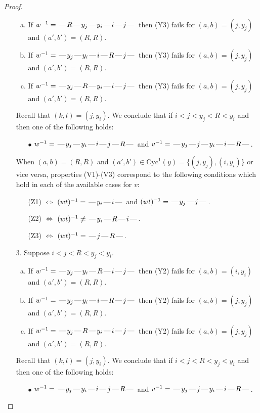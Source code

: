 \documentclass[10pt]{article}
\theoremstyle{definition}
\theoremstyle{definition}
\def\dash{\text{\hspace{0.5mm}---\hspace{0.5mm}}}
\def\Cyc{\mathrm{Cyc}}
\begin{document}
\begin{proof}
\begin{enumerate}
\begin{enumerate}[(a)]
\item If $w^{-1} = \dash R\dash y_j\dash y_i\dash i\dash j\dash $ then (Y3) fails for $(a,b)=(j,y_j)$ and $(a',b')=(R,R)$.
\item If $w^{-1} = \dash y_j\dash y_i\dash i\dash R\dash j\dash $ then (Y3) fails for $(a,b)=(j,y_j)$ and $(a',b')=(R,R)$.
\item If $w^{-1} = \dash y_j\dash R\dash y_i\dash i\dash j\dash $ then (Y3) fails for $(a,b)=(j,y_j)$ and $(a',b')=(R,R)$.
\end{enumerate}
Recall that $(k,l) = (j,y_i)$.
We conclude that if $i < j < y_j < R < y_i$ and then one of the following holds:
\begin{enumerate}
\item[$\bullet$] $w^{-1} = \dash y_j\dash y_i\dash i\dash j\dash R\dash $ and $v^{-1} = \dash y_j\dash j\dash y_i\dash i\dash R\dash $.
\end{enumerate}
When $(a,b)= (R, R)$ and $(a',b')\in \Cyc^1(y)=\{(j,y_j),(i,y_i)\}$ or vice versa,
properties (V1)-(V3) correspond to the following conditions which hold in
each of the available cases for $v$:
\begin{enumerate}
\item[](Z1) $\Leftrightarrow$ $(wt)^{-1} = \dash y_i \dash i \dash$  and $(wt)^{-1} = \dash y_j \dash j \dash$.
\item[](Z2) $\Leftrightarrow$ $(wt)^{-1} \neq \dash y_i \dash R \dash i \dash$.
\item[](Z3) $\Leftrightarrow$ $(wt)^{-1} = \dash j \dash R \dash$.
\end{enumerate}
\item[$3$.] Suppose $i < j < R < y_j < y_i$.
\begin{enumerate}[(a)]
\item If $w^{-1} = \dash y_j\dash y_i\dash R\dash i\dash j\dash $ then (Y2) fails for $(a,b)=(i,y_i)$ and $(a',b')=(R,R)$.
\item If $w^{-1} = \dash y_j\dash y_i\dash i\dash R\dash j\dash $ then (Y2) fails for $(a,b)=(j,y_j)$ and $(a',b')=(R,R)$.
\item If $w^{-1} = \dash y_j\dash R\dash y_i\dash i\dash j\dash $ then (Y2) fails for $(a,b)=(j,y_j)$ and $(a',b')=(R,R)$.
\end{enumerate}
Recall that $(k,l) = (j,y_i)$.
We conclude that if $i < j < R < y_j < y_i$ and then one of the following holds:
\begin{enumerate}
\item[$\bullet$] $w^{-1} = \dash y_j\dash y_i\dash i\dash j\dash R\dash $ and $v^{-1} = \dash y_j\dash j\dash y_i\dash i\dash R\dash $.

\end{enumerate}
\end{enumerate}
\end{proof}
\end{document}
